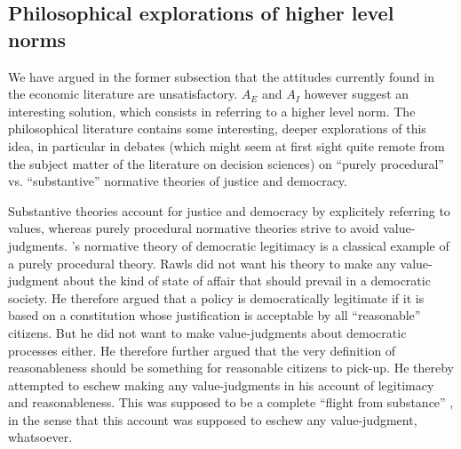 \documentclass[preprint, french, english, 11pt, authoryear]{elsarticle}%
\begin{document}
\subsection{Philosophical explorations of higher level norms}
\label{sec:higher}
We have argued in the former subsection that the attitudes currently found in the economic literature are unsatisfactory. $A_E$ and $A_I$ however suggest an interesting solution, which consists in referring to a higher level norm. The philosophical literature contains some interesting, deeper explorations of this idea, in particular in debates (which might seem at first sight quite remote from the subject matter of the literature on decision sciences) on “purely procedural” vs. “substantive” normative theories of justice and democracy.

Substantive theories account for justice and democracy by explicitely referring to values, whereas purely procedural normative theories strive to avoid value-judgments. \cite{rawls_political_2005}'s normative theory of democratic legitimacy is a classical example of a purely procedural theory. Rawls did not want his theory to make any value-judgment about the kind of state of affair that should prevail in a democratic society. He therefore argued that a policy is democratically legitimate if it is based on a constitution whose justification is acceptable by all  “reasonable” citizens. But he did not want to make value-judgments about democratic processes either. He therefore further argued that the very definition of reasonableness should be something for reasonable citizens to pick-up. He thereby attempted to eschew making any value-judgments in his account of legitimacy and reasonableness. This was supposed to be a complete ``flight from substance'' \citep{estlund_democratic_2009}, in the sense that this account was supposed to eschew any value-judgment, whatsoever.%
\end{document}

